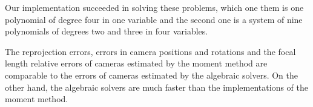 Our implementation succeeded in solving these problems, which one them is one polynomial of degree four in one variable and the second one is a system of nine polynomials of degrees two and three in four variables.

The reprojection errors, errors in camera positions and rotations and the focal length relative errors of cameras estimated by the moment method are comparable to the errors of cameras estimated by the algebraic solvers.
On the other hand, the algebraic solvers are much faster than the implementations of the moment method.
